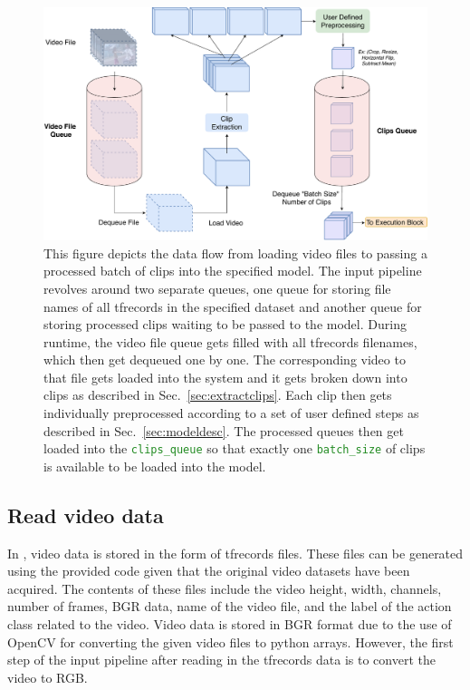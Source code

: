 \documentclass{llncs}
\begin{document}
\begin{figure}
\centering
\includegraphics[width=1.0\columnwidth]{images/ip_pipeline.pdf}
\caption{This figure depicts the data flow from loading video files to passing a processed batch of clips into the specified model.
The input pipeline revolves around two separate queues, one queue for storing file names of all tfrecords in the specified dataset and another queue for storing processed clips waiting to be passed to the model.
During runtime, the video file queue gets filled with all tfrecords filenames, which then get dequeued one by one.
The corresponding video to that file gets loaded into the system and it gets broken down into clips as described in Sec.~\ref{sec:extractclips}.
Each clip then gets individually preprocessed according to a set of user defined steps as described in Sec.~\ref{sec:modeldesc}.
The processed queues then get loaded into the \texttt{\textcolor{ForestGreen}{clips\_queue}} so that exactly one \texttt{\textcolor{ForestGreen}{batch\_size}} of clips is available to be loaded into the model.}
\label{fig:ip_block}
\end{figure}


\subsection{Read video data}
\label{sec:readdata}
In \acro, video data is stored in the form of tfrecords files.
These files can be generated using the provided code given that the original video datasets have been acquired.
The contents of these files include the video height, width, channels, number of frames, BGR data, name of the video file, and the label of the action class related to the video.
Video data is stored in BGR format due to the use of OpenCV for converting the given video files to python arrays.
However, the first step of the input pipeline after reading in the tfrecords data is to convert the video to RGB.
\end{document}
